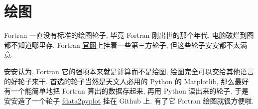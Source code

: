 \chapter{绘图}

Fortran 一直没有标准的绘图轮子, 毕竟 Fortran 刚出世的那个年代, 电脑破烂到图都不知道哪里存. Fortran \href{https://fortran-lang.org/packages/graphics/}{官网}上挂着一些第三方轮子, 但这些轮子安安都不太满意.

安安认为, Fortran 它的强项本来就是计算而不是绘图, 绘图完全可以交给其他语言的好轮子来干. 首选的轮子当然是天文人必用的 Python 的 Matplotlib, 那么最好有一个能简单地把 Fortran 算出的数据存起来, 再用 Python 读出来的轮子. 于是安安造了一个轮子 \href{https://github.com/GasinAn/fdata2pyplot}{fdata2pyplot} 挂在 Github 上. 有了它 Fortran 绘图就很方便啦.
